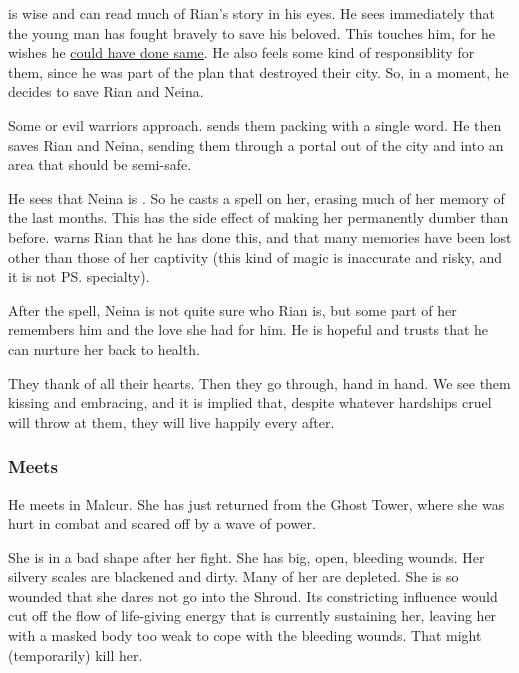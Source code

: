 \begin{garbage}
\Ishnaruchaefir{} is wise and can read much of Rian's story in his eyes. He sees immediately that the young man has fought bravely to save his beloved. This touches him, for he wishes he \hyperref[Ishnaruchaefir slays his beloved]{could have done same}. He also feels some kind of responsiblity for them, since he was part of the plan that destroyed their city. So, in a  moment, he decides to save Rian and Neina. 

Some \daemons{} or evil warriors approach. \Ishnaruchaefir{} sends them packing with a single word. He then saves Rian and Neina, sending them through a portal out of the city and into an area that should be semi-safe. 

He sees that Neina is . So he casts a spell on her, erasing much of her memory of the last months. This has the side effect of making her permanently dumber than before. \Ishnaruchaefir{} warns Rian that he has done this, and that many memories have been lost other than those of her captivity (this kind of magic is inaccurate and risky, and it is not \ps{\Ishnaruchaefir} specialty). 

After the spell, Neina is not quite sure who Rian is, but some part of her remembers him and the love she had for him. He is hopeful and trusts that he can nurture her back to health. 

They thank \Ishnaruchaefir{} of all their hearts. Then they go through, hand in hand. 
We see them kissing and embracing, and it is implied that, despite whatever hardships cruel \Miith{} will throw at them, they will live happily every after. 





\subsubsection{Meets \Nzessuacrith}
He meets \Nzessuacrith{} in Malcur. 
She has just returned from the Ghost Tower, where she was hurt in combat and scared off by a wave of \sathariah{} power. 

She is in a bad shape after her fight. 
She has big, open, bleeding wounds. 
Her silvery scales are blackened and dirty. 
Many of her  are depleted. 
She is so wounded that she dares not go into the Shroud. 
Its constricting influence would cut off the flow of life-giving \xsic{} energy that is currently sustaining her, leaving her with a masked body too weak to cope with the bleeding wounds. 
That might (temporarily) kill her. 


\end{garbage}
